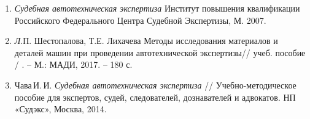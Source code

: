 \begin{enumerate}
% 
\item \emph{Судебная автотехническая экспертиза} Институт повышения квалификации Российского Федерального Центра Судебной Экспертизы, М. 2007.
%
\item \emph Л.П. Шестопалова, Т.Е. Лихачева {Методы исследования материалов и деталей машин при проведении автотехнической экспертизы}// учеб. пособие /
. – М.: МАДИ, 2017. – 180 с.
%
%
%
%
\item
Чава\,И.\,И. \emph {Судебная автотехническая экспертиза} // Учебно-методическое пособие для  экспертов,    судей, следователей, дознавателей и адвокатов. НП «Судэкс», Москва, 2014.
%
%
%
%
%
%

\end{enumerate}
